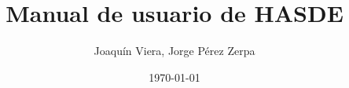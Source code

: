 \documentclass[a4paper,10pt,twocolumn]{article}
\begin{document}
 

\linenumbers

\title{Manual de usuario de HASDE}
\author{Joaquín Viera, Jorge Pérez Zerpa}
\date{\today}
\maketitle



\end{document}
